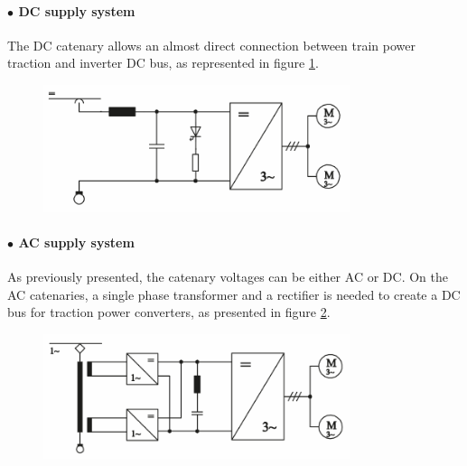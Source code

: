 \paragraph{$\bullet$ \ac{DC} supply system\\}


The \ac{DC} catenary allows an almost direct connection between train power traction and inverter DC bus, as represented in figure \ref{fig:steimel2008a}.


\begin{figure}[h!]
	\centering
	\begin{minipage}{.7\textwidth}
		\centering
		\includegraphics[width=0.8\textwidth,keepaspectratio]{figures/31.PowerS/steimel2008a}
		\label{fig:steimel2008a}
	\end{minipage}
\end{figure}


\paragraph{$\bullet$ \ac{AC} supply system\\}

As previously presented, the catenary voltages can be either \ac{AC} or \ac{DC}. On the AC catenaries, a single phase transformer and a rectifier is needed to create a \ac{DC} bus for traction power converters, as presented in figure \ref{fig:steimel2008b}.

\begin{figure}[h!]
	\centering
	\begin{minipage}{.7\textwidth}
		\centering
		\includegraphics[width=0.8\textwidth,keepaspectratio]{figures/31.PowerS/steimel2008b}
		\label{fig:steimel2008b}
	\end{minipage}
\end{figure}




